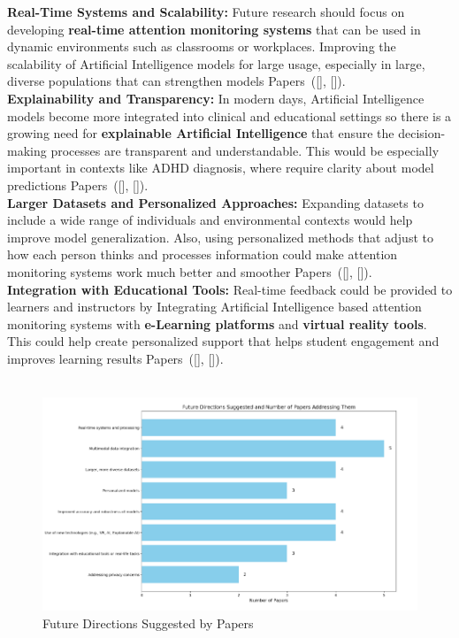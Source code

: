 \documentclass[12pt]{article}
\begin{document}
\textbullet \textbf{Real-Time Systems and Scalability:} Future research should focus on developing \textbf{real-time attention monitoring systems} that can be used in dynamic environments such as classrooms or workplaces. Improving the scalability of Artificial Intelligence models for large usage, especially in large, diverse populations that can strengthen models Papers~([\citealp{ref6}], [\citealp{ref16}]). \\ 

\textbullet \textbf{Explainability and Transparency:} In modern days, Artificial Intelligence models become more integrated into clinical and educational settings so there is a growing need for \textbf{explainable Artificial Intelligence} that ensure the decision-making processes are transparent and understandable. This would be especially important in contexts like ADHD diagnosis, where require clarity about model predictions Papers~([\citealp{ref10}], [\citealp{ref19}]). \\ 

\textbullet \textbf{Larger Datasets and Personalized Approaches:} Expanding datasets to include a wide range of individuals and environmental contexts would help improve model generalization. Also, using personalized methods that adjust to how each person thinks and processes information could make attention monitoring systems work much better and smoother Papers~([\citealp{ref5}], [\citealp{ref9}]). \\ 

\textbullet \textbf{Integration with Educational Tools:} Real-time feedback could be provided to learners and instructors by Integrating Artificial Intelligence based attention monitoring systems with \textbf{e-Learning platforms} and \textbf{virtual reality tools}. This could help create personalized support that helps student engagement and improves learning results Papers~([\citealp{ref8}], [\citealp{ref7}]). \\ \\


\begin{figure}[H]
\centering
\includegraphics[width=1.0\textwidth]{bar.png}
\caption{Future Directions Suggested by Papers}
\end{figure}
\end{document}
